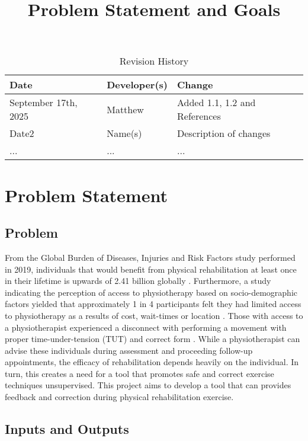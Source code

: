 \documentclass{article}
\title{Problem Statement and Goals\\\progname}
\author{\authname}
\date{}
\begin{document}
\maketitle

\begin{table}[hp]
\caption{Revision History} \label{TblRevisionHistory}
\begin{tabularx}{\textwidth}{llX}
\toprule
\textbf{Date} & \textbf{Developer(s)} & \textbf{Change}\\
\midrule
September 17th, 2025 & Matthew & Added 1.1, 1.2 and References\\
Date2 & Name(s) & Description of changes\\
... & ... & ...\\
\bottomrule
\end{tabularx}
\end{table}

\section{Problem Statement}

\subsection{Problem}

From the Global Burden of Diseases, Injuries and Risk Factors study performed in 2019, 
individuals that would benefit from physical rehabilitation at least once in their 
lifetime is upwards of 2.41 billion globally \citep{CiezaEtAl2021}.
Furthermore, a study indicating the perception of access to physiotherapy based on 
socio-demographic factors yielded that approximately 1 in 4 participants 
felt they had limited access to physiotherapy as a results of cost, wait-times or 
location \citep{BathEtAl2016}. Those with access to a physiotherapist experienced a 
disconnect with performing a movement with proper time-under-tension (TUT) and 
correct form \citep{FaberEtAl2015}. While a physiotherapist can advise these individuals
during assessment and proceeding follow-up appointments, the efficacy of rehabilitation
depends heavily on the individual. In turn, this creates a need for a tool that promotes safe and 
correct exercise techniques unsupervised. This project aims to develop a tool that can 
provides feedback and correction during physical rehabilitation exercise.

\subsection{Inputs and Outputs}
\end{document}
